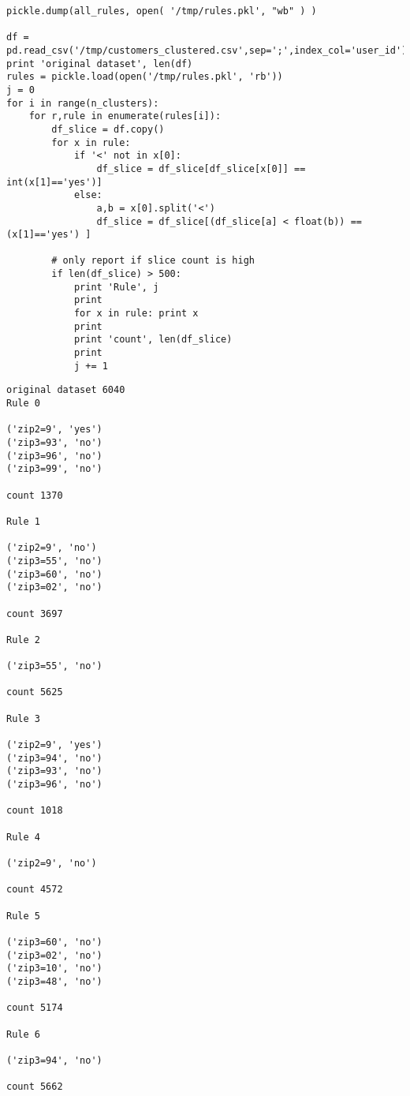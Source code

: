 \documentclass[12pt,fleqn]{article}\usepackage{../common}
\begin{document}
\begin{verbatim}
pickle.dump(all_rules, open( '/tmp/rules.pkl', "wb" ) )        

df = pd.read_csv('/tmp/customers_clustered.csv',sep=';',index_col='user_id')
print 'original dataset', len(df)
rules = pickle.load(open('/tmp/rules.pkl', 'rb'))
j = 0
for i in range(n_clusters):
    for r,rule in enumerate(rules[i]): 
        df_slice = df.copy()
        for x in rule: 
            if '<' not in x[0]: 
                df_slice = df_slice[df_slice[x[0]] == int(x[1]=='yes')]
            else:
                a,b = x[0].split('<')
                df_slice = df_slice[(df_slice[a] < float(b)) == (x[1]=='yes') ]

        # only report if slice count is high
        if len(df_slice) > 500:
            print 'Rule', j
            print
            for x in rule: print x
            print
            print 'count', len(df_slice)
            print
            j += 1
\end{verbatim}

\begin{verbatim}
original dataset 6040
Rule 0

('zip2=9', 'yes')
('zip3=93', 'no')
('zip3=96', 'no')
('zip3=99', 'no')

count 1370

Rule 1

('zip2=9', 'no')
('zip3=55', 'no')
('zip3=60', 'no')
('zip3=02', 'no')

count 3697

Rule 2

('zip3=55', 'no')

count 5625

Rule 3

('zip2=9', 'yes')
('zip3=94', 'no')
('zip3=93', 'no')
('zip3=96', 'no')

count 1018

Rule 4

('zip2=9', 'no')

count 4572

Rule 5

('zip3=60', 'no')
('zip3=02', 'no')
('zip3=10', 'no')
('zip3=48', 'no')

count 5174

Rule 6

('zip3=94', 'no')

count 5662

\end{verbatim}
\end{document}

